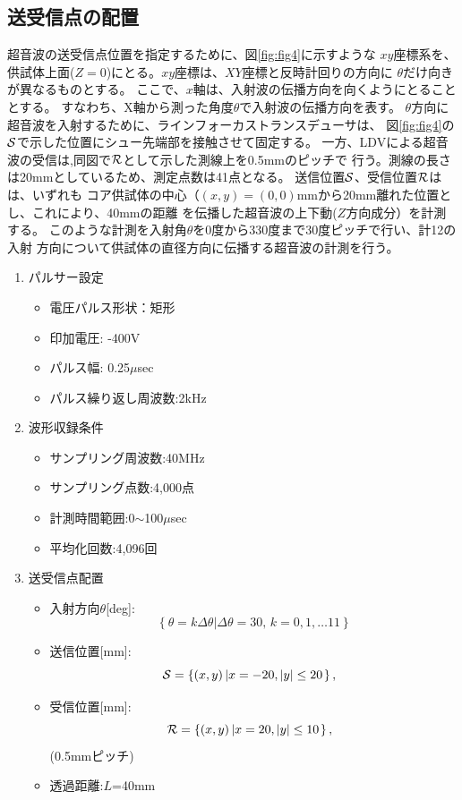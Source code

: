 \subsection{送受信点の配置}
超音波の送受信点位置を指定するために、図\ref{fig:fig4}に示すような
$xy$座標系を、供試体上面($Z=0$)にとる。$xy$座標は、$XY$座標と反時計回りの方向に
$\theta$だけ向きが異なるものとする。
ここで、$x$軸は、入射波の伝播方向を向くようにとることとする。
すなわち、X軸から測った角度$\theta$で入射波の伝播方向を表す。
$\theta$方向に超音波を入射するために、ラインフォーカストランスデューサは、
図\ref{fig:fig4}の$\cal S$で示した位置にシュー先端部を接触させて固定する。
一方、LDVによる超音波の受信は,同図で${\cal R}$として示した測線上を0.5mmのピッチで
行う。測線の長さは20mmとしているため、測定点数は41点となる。
送信位置$\cal S$、受信位置$\cal R$はは、いずれも
コア供試体の中心（$(x,y)=(0,0)$mmから20mm離れた位置とし、これにより、40mmの距離
を伝播した超音波の上下動($Z$方向成分）を計測する。
このような計測を入射角$\theta$を0度から330度まで30度ピッチで行い、計12の入射
方向について供試体の直径方向に伝播する超音波の計測を行う。
\begin{enumerate}
\item パルサー設定
	\begin{itemize}
		\item 電圧パルス形状：矩形
		\item 印加電圧: -400V
		\item パルス幅: 0.25$\mu$sec 
		\item パルス繰り返し周波数:2kHz
	\end{itemize}
\item 波形収録条件
	\begin{itemize}
		\item サンプリング周波数:40MHz
		\item サンプリング点数:4,000点
		\item 計測時間範囲:0$\sim$100$\mu$sec
		\item 平均化回数:4,096回
	\end{itemize}
\item 送受信点配置
	\begin{itemize}
		\item 入射方向$\theta$[deg]:
			\[
				\left\{ 
				\theta=k \Delta \theta \left| \Delta \theta=30,\, k=0,1,\dots 11\right.
				\right\}
			\]
		\item 送信位置[mm]:
			\[
				{\cal S}=\left\{ (x,y)\left| x=-20, |y| \leq 20\right.\right\}, \ \ 
			\]
		\item 受信位置[mm]:
			\[
				{\cal R}=\left\{ (x,y)\left| x=20,  |y| \leq 10\right.\right\}, \ \ 
			\](0.5mmピッチ)
		\item 透過距離:$L$=40mm
	\end{itemize}
\end{enumerate}
